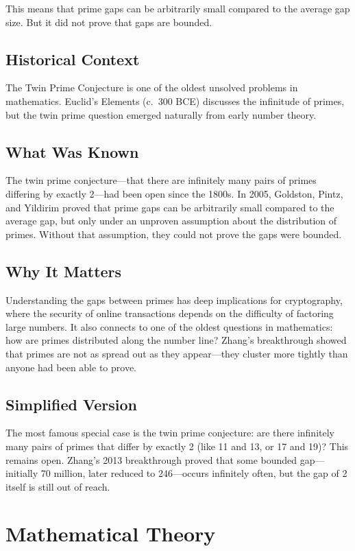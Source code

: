This means that prime gaps can be arbitrarily small compared to the average gap size. But it did not prove that gaps are bounded.

\subsection{Historical Context}
The Twin Prime Conjecture is one of the oldest unsolved problems in mathematics. Euclid's Elements (c.\ 300 BCE) discusses the infinitude of primes, but the twin prime question emerged naturally from early number theory.

\subsection{What Was Known}
The twin prime conjecture---that there are infinitely many pairs of primes differing by exactly 2---had been open since the 1800s. In 2005, Goldston, Pintz, and Yildirim proved that prime gaps can be arbitrarily small compared to the average gap, but only under an unproven assumption about the distribution of primes. Without that assumption, they could not prove the gaps were bounded.

\subsection{Why It Matters}
Understanding the gaps between primes has deep implications for cryptography, where the security of online transactions depends on the difficulty of factoring large numbers. It also connects to one of the oldest questions in mathematics: how are primes distributed along the number line? Zhang's breakthrough showed that primes are not as spread out as they appear---they cluster more tightly than anyone had been able to prove.

\subsection{Simplified Version}
The most famous special case is the twin prime conjecture: are there infinitely many pairs of primes that differ by exactly 2 (like 11 and 13, or 17 and 19)? This remains open. Zhang's 2013 breakthrough proved that some bounded gap---initially 70 million, later reduced to 246---occurs infinitely often, but the gap of 2 itself is still out of reach.

\section{Mathematical Theory}


